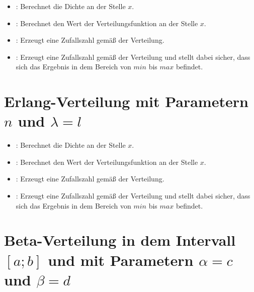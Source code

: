\begin{itemize}

\item
{}:
Berechnet die Dichte an der Stelle $x$.

\item
{}:
Berechnet den Wert der Verteilungsfunktion an der Stelle $x$.

\item
{}:
Erzeugt eine Zufallszahl gemäß der Verteilung.

\item
{}:
Erzeugt eine Zufallszahl gemäß der Verteilung und stellt dabei sicher, dass sich das Ergebnis in dem Bereich von $min$ bis $max$ befindet.

\end{itemize}



\section{Erlang-Verteilung mit Parametern \texorpdfstring{$n$}{n} und \texorpdfstring{$\lambda=l$}{l}}

\begin{itemize}

\item
{}:
Berechnet die Dichte an der Stelle $x$.

\item
{}:
Berechnet den Wert der Verteilungsfunktion an der Stelle $x$.

\item
{}:
Erzeugt eine Zufallszahl gemäß der Verteilung.

\item
{}:
Erzeugt eine Zufallszahl gemäß der Verteilung und stellt dabei sicher, dass sich das Ergebnis in dem Bereich von $min$ bis $max$ befindet.

\end{itemize}



\section{Beta-Verteilung in dem Intervall \texorpdfstring{$[a;b]$}{[a;b]} und mit Parametern \texorpdfstring{$\alpha=c$}{c} und \texorpdfstring{$\beta=d$}{d}}

